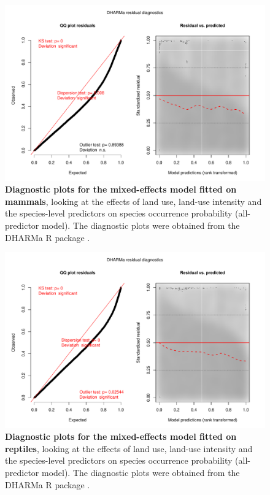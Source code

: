 \documentclass[11pt]{article}
\begin{document}
\begin{figure}[h!]
\centering
\includegraphics[scale=0.5]{Figures/LU_Diag_mammals}
\caption[]{\textbf{Diagnostic plots for the mixed-effects model fitted on mammals}, looking at the effects of land use, land-use intensity and the species-level predictors on species occurrence probability (all-predictor model). The diagnostic plots were obtained from the DHARMa R package \citep{DHARMa}.}
\label{}
\end{figure}

\begin{figure}[h!]
\centering
\includegraphics[scale=0.5]{Figures/LU_Diag_reptiles}
\caption[]{\textbf{Diagnostic plots for the mixed-effects model fitted on reptiles}, looking at the effects of land use, land-use intensity and the species-level predictors on species occurrence probability (all-predictor model). The diagnostic plots were obtained from the DHARMa R package \citep{DHARMa}.}
\label{}
\end{figure}
\end{document}
